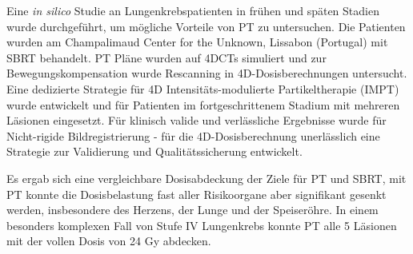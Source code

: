 Eine \textit{in silico} Studie an Lungenkrebspatienten in fr\"{u}hen und sp\"{a}ten Stadien wurde durchgef\"{u}hrt, 
um m\"{o}gliche Vorteile von PT zu untersuchen. Die Patienten wurden am Champalimaud Center for the 
Unknown, Lissabon (Portugal) mit SBRT behandelt. PT Pl\"{a}ne wurden auf 4DCTs simuliert und zur 
Bewegungskompensation wurde Rescanning in 4D-Dosisberechnungen untersucht. Eine dedizierte Strategie 
f\"{u}r 4D Intensit\"{a}ts-modulierte Partikeltherapie (IMPT) wurde entwickelt und f\"{u}r Patienten im fortgeschrittenem 
Stadium mit mehreren L\"{a}sionen eingesetzt. F\"{u}r klinisch valide und verl\"{a}ssliche Ergebnisse wurde f\"{u}r Nicht-rigide
Bildregistrierung - f\"{u}r die 4D-Dosisberechnung unerl\"{a}sslich eine Strategie zur Validierung und Qualit\"{a}tssicherung entwickelt.

Es ergab sich eine vergleichbare Dosisabdeckung der Ziele f\"{u}r PT und SBRT, mit PT konnte die 
Dosisbelastung fast aller Risikoorgane aber signifikant gesenkt werden, insbesondere des Herzens, der Lunge und der Speiser\"{o}hre. 
In einem besonders komplexen Fall von Stufe IV Lungenkrebs konnte PT alle 5 L\"{a}sionen mit der vollen Dosis von 24 Gy abdecken.



